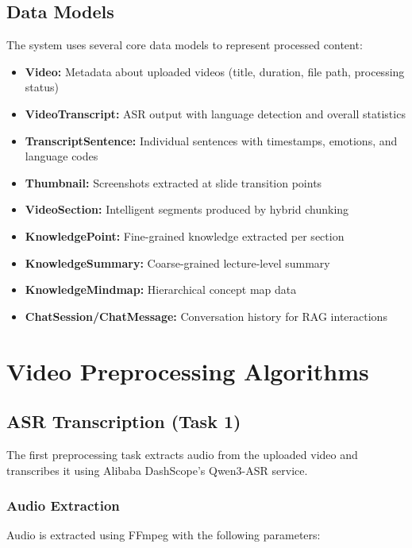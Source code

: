 \documentclass[12pt,a4paper]{article}
\begin{document}
\subsection{Data Models}

The system uses several core data models to represent processed content:

\begin{itemize}
    \item \textbf{Video:} Metadata about uploaded videos (title, duration, file path, processing status)
    \item \textbf{VideoTranscript:} ASR output with language detection and overall statistics
    \item \textbf{TranscriptSentence:} Individual sentences with timestamps, emotions, and language codes
    \item \textbf{Thumbnail:} Screenshots extracted at slide transition points
    \item \textbf{VideoSection:} Intelligent segments produced by hybrid chunking
    \item \textbf{KnowledgePoint:} Fine-grained knowledge extracted per section
    \item \textbf{KnowledgeSummary:} Coarse-grained lecture-level summary
    \item \textbf{KnowledgeMindmap:} Hierarchical concept map data
    \item \textbf{ChatSession/ChatMessage:} Conversation history for RAG interactions
\end{itemize}

\newpage

\section{Video Preprocessing Algorithms}
\label{sec:preprocessing}

\subsection{ASR Transcription (Task 1)}

The first preprocessing task extracts audio from the uploaded video and transcribes it using Alibaba DashScope's Qwen3-ASR service.

\subsubsection{Audio Extraction}

Audio is extracted using FFmpeg with the following parameters:
\end{document}
